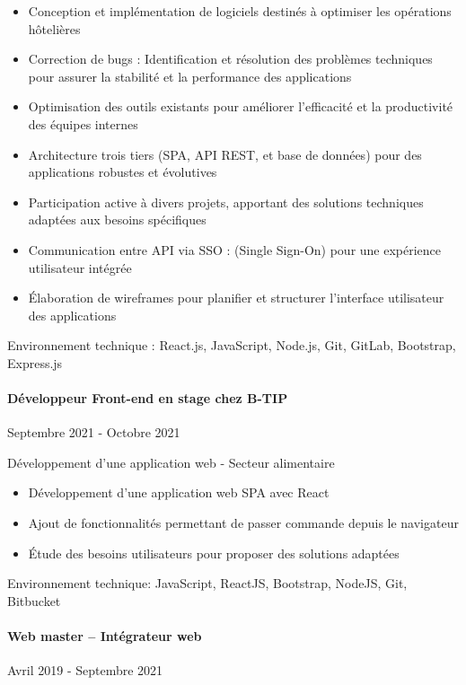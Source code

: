 \documentclass{article}
\begin{document}
\raggedright
\begin{itemize}
  \item{Conception et implémentation de logiciels destinés à optimiser les opérations hôtelières}
  \item{Correction de bugs : Identification et résolution des problèmes techniques pour assurer la stabilité
    et la performance des applications}
  \item{Optimisation des outils existants pour améliorer l'efficacité et la productivité des équipes internes}
  \item{Architecture trois tiers (SPA, API REST, et base de données) pour des applications robustes
    et évolutives}
  \item{Participation active à divers projets, apportant des solutions techniques adaptées aux besoins
spécifiques}
  \item{Communication entre API via SSO : (Single Sign-On) pour une expérience utilisateur intégrée}
  \item{Élaboration de wireframes pour planifier et structurer l'interface utilisateur des applications}
\end{itemize}
\noindent
Environnement technique : React.js, JavaScript, Node.js, Git, GitLab, Bootstrap, Express.js
\paragraph{Développeur Front-end en stage chez B-TIP}\hspace*{\fill}Septembre 2021 - Octobre 2021

\noindent
Développement d’une application web - Secteur alimentaire

\raggedright  
\begin{itemize}
  \item{Développement d'une application web SPA avec React}
  \item{Ajout de fonctionnalités permettant de passer commande depuis le navigateur}
  \item{Étude des besoins utilisateurs pour proposer des solutions adaptées}
\end{itemize}
\noindent
Environnement technique: JavaScript, ReactJS, Bootstrap, NodeJS, Git, Bitbucket
\paragraph{Web master – Intégrateur web}\hspace*{\fill}Avril 2019 - Septembre 2021
\end{document}
